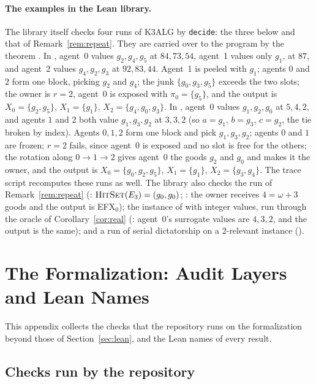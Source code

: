 \documentclass[runningheads,11pt]{llncs}
\newcommand{\efxz}{\texorpdfstring{\mbox{EFX$_0$}}{EFX0}}
\newcommand{\HitSet}{\textup{\textsc{HitSet}}}
\begin{document}
\paragraph{The examples in the Lean library.} The library itself checks four runs of K3ALG by \texttt{decide}: the three below and that of Remark~\ref{rem:repeat}. They are carried over to the program  by the theorem . In , agent~0 values $g_2,g_4,g_5$ at $84,73,54$, agent~1 values only $g_1$, at $87$, and agent~2 values $g_4,g_2,g_3$ at $92,83,44$. Agent~1 is peeled with $g_1$; agents $0$ and $2$ form one block, picking $g_2$ and $g_4$; the junk $\{g_0,g_3,g_5\}$ exceeds the two slots; the owner is $r=2$, agent~0 is exposed with $\pi_0=\{g_5\}$, and the output is $X_0=\{g_2,g_5\}$, $X_1=\{g_1\}$, $X_2=\{g_4,g_0,g_3\}$. In , agent~0 values $g_1,g_2,g_0$ at $5,4,2$, and agents $1$ and $2$ both value $g_1,g_3,g_2$ at $3,3,2$ (so $a=g_1$, $b=g_3$, $c=g_2$, the tie broken by index). Agents $0,1,2$ form one block and pick $g_1,g_3,g_2$; agents $0$ and $1$ are frozen; $r=2$ fails, since agent~0 is exposed and no slot is free for the others; the rotation along $0\to1\to2$ gives agent~0 the goods $g_2$ and $g_0$ and makes it the owner, and the output is $X_0=\{g_0,g_2,g_5\}$, $X_1=\{g_1\}$, $X_2=\{g_3,g_4\}$. The trace script recomputes these runs as well. The library also checks the run of Remark~\ref{rem:repeat} (: $\HitSet(E_3)=(g_0,g_0)$; : the owner receives $4=\omega+3$ goods and the output is \efxz{}); the instance of  with integer values, run through the oracle of Corollary~\ref{cor:real} (: agent~0's surrogate values are $4,3,2$, and the output is the same); and a run of serial dictatorship on a $2$-relevant instance ().

\section{The Formalization: Audit Layers and Lean Names}\label{app:audit}

This appendix collects the checks that the repository runs on the formalization beyond those of Section~\ref{sec:lean}, and the Lean names of every result.

\subsection{Checks run by the repository}
\end{document}
